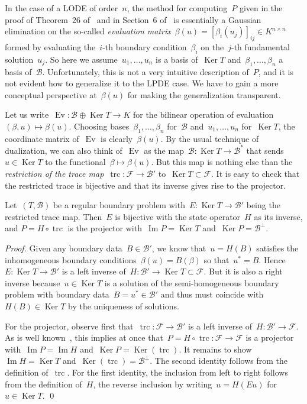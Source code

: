 \documentclass[a4paper]{llncs}
\renewcommand{\ker}{\operatorname{Ker}}
\newcommand{\im}{\operatorname{Im}}
\newcommand{\orth}[1]{#1^\perp}
\newcommand{\Ev}{\operatorname{Ev}}
\newcommand{\trc}{\operatorname{trc}}
\newcommand{\galg}{\mathcal{F}}
\newcommand{\bspc}{\mathcal{B}}
\newenvironment{myproof}{\begin{proof}}{\qed\end{proof}}
\begin{document}
In the case of a LODE of order~$n$, the method for computing~$P$ given in the
proof of Theorem~26 of~\cite{RosenkranzRegensburger2008a} and in Section~6
of~\cite{RegensburgerRosenkranz2009} is essentially a Gaussian elimination on
the so-called \emph{evaluation matrix}~$\beta(u) = [\beta_i(u_j)]_{ij} \in K^{n
  \times n}$ formed by evaluating the~$i$-th boundary condition~$\beta_i$ on
the~$j$-th fundamental solution~$u_j$. So here we assume~$u_1, \dots, u_n$ is a
basis of~$\ker{T}$ and~$\beta_1, \dots, \beta_n$ a basis
of~$\bspc$. Unfortunately, this is not a very intuitive description of~$P$, and
it is not evident how to generalize it to the LPDE case. We have to gain a more
conceptual perspective at~$\beta(u)$ for making the generalization transparent.

Let us write~$\Ev\colon \bspc \oplus \ker{T} \to K$ for the bilinear operation
of evaluation $(\beta, u) \mapsto \beta(u)$. Choosing bases~$\beta_1, \dots,
\beta_n$ for~$\bspc$ and~$u_1, \dots, u_n$ for~$\ker{T}$, the coordinate matrix
of~$\Ev$ is clearly~$\beta(u)$. By the usual technique of dualization, we can
also think of~$\Ev$ as the map~$\bspc\colon \ker{T} \to \bspc^*$ that sends~$u
\in \ker{T}$ to the functional~$\beta \mapsto \beta(u)$. But this map is nothing
else than the \emph{restriction of the trace map}~$\trc\colon \galg \to \bspc'$
to~$\ker{T} \subset \galg$. It is easy to check that the restricted trace is
bijective and that its inverse gives rise to the projector.

\begin{myproposition}
  \label{prop:proj}
  Let~$(T, \bspc)$ be a regular boundary problem with~$E\colon \ker{T} \to
  \bspc'$ being the restricted trace map. Then~$E$ is bijective with the state
  operator~$H$ as its inverse, and $P = H \circ \trc$ is the projector
  with~$\im{P} = \ker{T}$ and~$\ker{P} = \orth{\bspc}$.
\end{myproposition}
\begin{myproof}
  Given any boundary data~$B \in \bspc'$, we know that~$u = H(B)$ satisfies the
  inhomogeneous boundary conditions~$\beta(u) = B(\beta)$ so that~$u^* =
  B$. Hence~$E\colon \ker{T} \to \bspc'$ is a left inverse of~$H\colon \bspc'
  \to \ker{T} \subset \galg$. But it is also a right inverse because~$u \in
  \ker{T}$ is a solution of the semi-homogeneous boundary problem with boundary
  data~$B = u^* \in \bspc'$ and thus must coincide with~$H(B) \in \ker{T}$ by
  the uniqueness of solutions.

  For the projector, observe first that~$\trc\colon \galg \to \bspc'$ is a left
  inverse of~$H\colon \bspc' \to \galg$. As is well
  known~\cite[(A.16)]{RegensburgerRosenkranz2009}, this implies at once that~$P
  = H \circ \trc\colon \galg \to \galg$ is a projector with~$\im{P} = \im{H}$
  and~$\ker{P} = \ker(\trc)$. It remains to show~$\im{H} = \ker{T}$
  and~$\ker(\trc) = \orth{\bspc}$. The second identity follows from the
  definition of~$\trc$. For the first identity, the inclusion from left to right
  follows from the definition of~$H$, the reverse inclusion by writing~$u =
  H(Eu)$ for~$u \in \ker{T}$.
\end{myproof}
\end{document}
